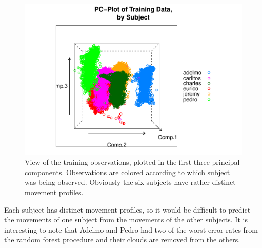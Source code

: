 \documentclass[12pt,twoside]{reedthesis}
\begin{document}
  \begin{Shaded}
  \begin{Highlighting}[]
   \NormalTok{~}\StringTok{ } \NormalTok{*}\StringTok{ }\NormalTok{, } 
         \NormalTok{(} \NormalTok{, } \NormalTok{, } \NormalTok{),}
         \NormalTok{(} \NormalTok{),}
         \NormalTok{)}
  \end{Highlighting}
  \end{Shaded}
  
  \begin{figure}
  
  {\centering \includegraphics{A_Random_Forest_Model_for_Computer-Assisted_Activity-Recognition_files/figure-latex/unnamed-chunk-53-1} 
  
  }
  
  \caption[View of the training observations, plotted in the first three principal components]{View of the training observations, plotted in the first three principal components.  Observations are colored according to which subject was being observed.  Obviously the six subjects have rather distinct movement profiles.}\label{fig:unnamed-chunk-53}
  \end{figure}
  
  Each subject has distinct movement profiles, so it would be difficult to
  predict the movements of one subject from the movements of the other
  subjects. It is interesting to note that Adelmo and Pedro had two of the
  worst error rates from the random forest procedure and their clouds are
  removed from the others.
  
\end{document}
